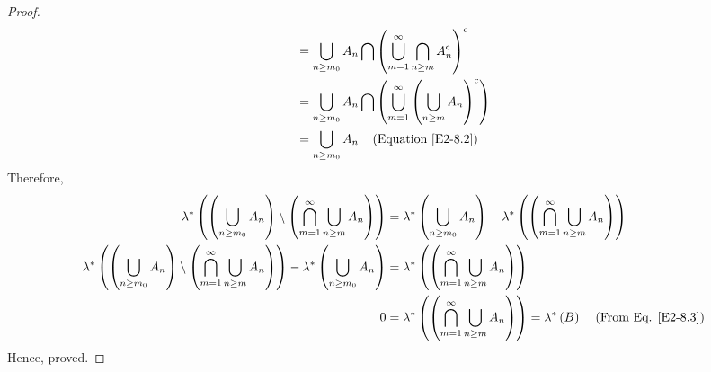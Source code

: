 \documentclass{article}
\theoremstyle{definition}
\theoremstyle{remark}
\theoremstyle{definition}
\theoremstyle{definition}
\theoremstyle{definition}
\newcommand{\bunion}{\bigcup}
\newcommand{\bintrs}{\bigcap}
\newcommand{\comp}[1]{#1^{\text{c}}}
\newcommand{\lom}[1]{\lambda^*\left (#1\right )}
\begin{document}
\begin{enumerate}
{\begin{proof}
\begin{equation}
\begin{split}
			&= \bunion_{n\ge m_0} A_n \bintrs \comp{\left (\bunion_{m=1}^{\infty} \bintrs_{n\ge m}\comp{A_n}\right )}\\
			&= \bunion_{n\ge m_0}A_n \bintrs \left (\bunion_{m=1}^{\infty}\comp{\left (\bunion_{n\ge m}A_n\right )} \right) \\
			&= \bunion_{n\ge m_0}A_n\;\;\;\;\text{(Equation \ref{E2-8.2})}
		\end{split}
	\end{equation}
Therefore, 
\begin{equation*}
	\begin{split}
		\lom{\left (\bunion_{n\ge m_0} A_n\right ) \setminus \left (\bintrs_{m=1}^{\infty} \bunion_{n\ge m} A_n\right )} &= \lom{\bunion_{n\ge m_0} A_n} - \lom{\left (\bintrs_{m=1}^{\infty} \bunion_{n\ge m} A_n\right )}\\
		\lom{\left (\bunion_{n\ge m_0} A_n\right ) \setminus \left (\bintrs_{m=1}^{\infty} \bunion_{n\ge m} A_n\right )} - \lom{\bunion_{n\ge m_0} A_n} &= \lom{\left (\bintrs_{m=1}^{\infty} \bunion_{n\ge m} A_n\right )}\\
		0 &= \lom{\left (\bintrs_{m=1}^{\infty} \bunion_{n\ge m} A_n\right )} = \lom{B} \;\;\;\;\text{(From Eq. \ref{E2-8.3})}
	\end{split}
\end{equation*}
Hence, proved.


\end{proof}}
\end{enumerate}
\end{document}
